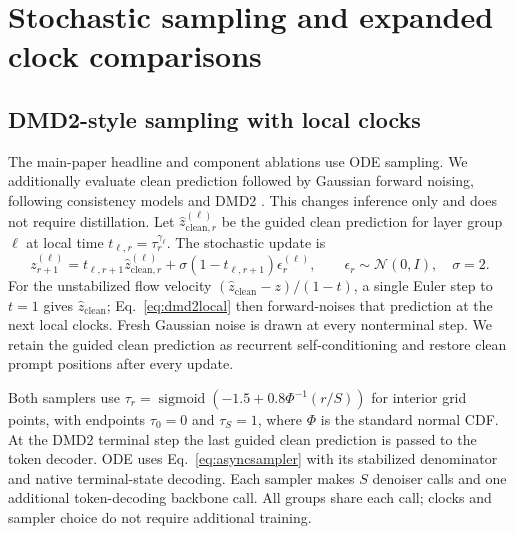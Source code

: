 \documentclass{article}
\newenvironment{revision}{\begingroup\color{blue}}{\endgroup}
\begin{document}
\clearpage
\begin{revision}
\section{Stochastic sampling and expanded clock comparisons}
\label{app:stochasticsampling}
\subsection{DMD2-style sampling with local clocks}
The main-paper headline and component ablations use ODE sampling. We additionally evaluate clean prediction followed by Gaussian forward noising, following consistency models and DMD2 \citep{consistencymodels,dmd2}. This changes inference only and does not require distillation. Let $\widehat z_{\mathrm{clean},r}^{(\ell)}$ be the guided clean prediction for layer group $\ell$ at local time $t_{\ell,r}=\tau_r^{\gamma_\ell}$. The stochastic update is
\begin{equation}
 z_{r+1}^{(\ell)}=t_{\ell,r+1}\widehat z_{\mathrm{clean},r}^{(\ell)}
 +\sigma(1-t_{\ell,r+1})\epsilon_r^{(\ell)},\qquad
 \epsilon_r\sim\mathcal N(0,I),\quad \sigma=2.
 \label{eq:dmd2local}
\end{equation}
For the unstabilized flow velocity $(\widehat z_{\mathrm{clean}}-z)/(1-t)$, a single Euler step to $t=1$ gives $\widehat z_{\mathrm{clean}}$; Eq.~\eqref{eq:dmd2local} then forward-noises that prediction at the next local clocks. Fresh Gaussian noise is drawn at every nonterminal step. We retain the guided clean prediction as recurrent self-conditioning and restore clean prompt positions after every update.

Both samplers use $\tau_r=\operatorname{sigmoid}(-1.5+0.8\Phi^{-1}(r/S))$ for interior grid points, with endpoints $\tau_0=0$ and $\tau_S=1$, where $\Phi$ is the standard normal CDF. At the DMD2 terminal step the last guided clean prediction is passed to the token decoder. ODE uses Eq.~\eqref{eq:asyncsampler} with its stabilized denominator and native terminal-state decoding. Each sampler makes $S$ denoiser calls and one additional token-decoding backbone call. All groups share each call; clocks and sampler choice do not require additional training.


\end{revision}
\end{document}
